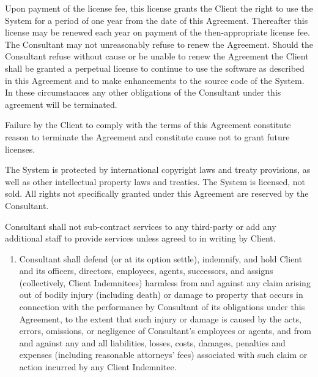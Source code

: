 \documentclass{tccontract}
\begin{document}
\begin{body}
Upon payment of the license fee, this license grants the Client the
right to use the System for a period of one year from the date of this
Agreement. Thereafter this license may be renewed each year on payment
of the then-appropriate license fee. The Consultant may not
unreasonably refuse to renew the Agreement. Should the Consultant
refuse without cause or be unable to renew the Agreement the Client
shall be granted a perpetual license to continue to use the software
as described in this Agreement and to make enhancements to the source
code of the System. In these circumstances any other obligations of
the Consultant under this agreement will be terminated.

Failure by the Client to comply with the terms of this Agreement
constitute reason to terminate the Agreement and constitute cause not
to grant future licenses.



The System is protected by international copyright laws and treaty
provisions, as well as other intellectual property laws and
treaties. The System is licensed, not sold.  All rights not
specifically granted under this Agreement are reserved by the
Consultant.


Consultant shall not sub-contract services to any third-party  
or add any additional staff to provide services unless agreed to in
writing by Client.


\begin{enumerate}
\item Consultant shall defend (or at its option settle), indemnify,
  and hold Client and its officers, directors, employees, agents,
  successors, and assigns (collectively, Client Indemnitees) harmless
  from and against any claim arising out of bodily injury (including
  death) or damage to property that occurs in connection with the
  performance by Consultant of its obligations under this Agreement,
  to the extent that such injury or damage is caused by the acts,
  errors, omissions, or negligence of Consultant's employees or
  agents, and from and against any and all liabilities, losses, costs,
  damages, penalties and expenses (including reasonable attorneys'
  fees) associated with such claim or action incurred by any Client
  Indemnitee.
  

\end{enumerate}
\end{body}
\end{document}
